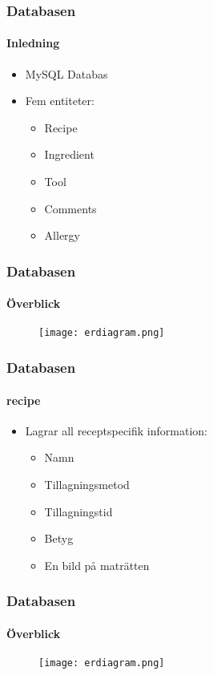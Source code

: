 
\begin{frame}
  \frametitle{Databasen}
  \framesubtitle{Inledning}
  \begin{itemize}
    \item<1-> MySQL Databas
    \item<2-> Fem entiteter:
      \begin{itemize}
      \item<3-> Recipe
      \item<4-> Ingredient
      \item<5-> Tool
      \item<6-> Comments
      \item<7-> Allergy
      \end{itemize}
  \end{itemize}
\end{frame}


\begin{frame}
  \frametitle{Databasen}
  \framesubtitle{Överblick}
  \begin{figure}[H]
        \centering 
        \texttt{[image: erdiagram.png]} 
        \label{fig:erdiagram}
\end{figure}
\end{frame}


\begin{frame}[c]
  \frametitle{Databasen}
  \framesubtitle{recipe}
  \begin{itemize}
    \item<1-> Lagrar all receptspecifik information:
      \begin{itemize}
        \item Namn 
        \item Tillagningsmetod
        \item Tillagningstid
        \item Betyg
        \item En bild på maträtten
      \end{itemize}
 \end{itemize}
\end{frame}


\begin{frame}[c]
  \frametitle{Databasen}
  \framesubtitle{Överblick}
  \begin{figure}[H]
    \centering 
    \texttt{[image: erdiagram.png]} 
    \label{fig:erdiagram}
  \end{figure}
\end{frame}

